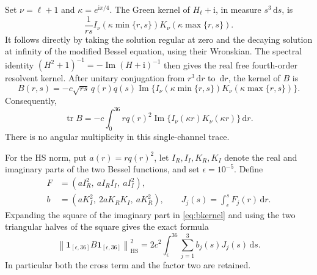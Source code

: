 \documentclass[11pt,a4paper]{article}
\theoremstyle{definition}\newtheorem{definition}[theorem]{Definition}
\theoremstyle{remark}\newtheorem{remark}[theorem]{Remark}
\newcommand{\ii}{\mathrm i}
\newcommand{\dd}{\,\mathrm d}
\newcommand{\norm}[1]{\left\|#1\right\|}
\newcommand{\tr}{\operatorname{tr}}
\newcommand{\HS}{\mathrm{HS}}
\newcommand{\Ima}{\operatorname{Im}}
\begin{document}
Set \(\nu=\ell+1\) and \(\kappa=e^{\ii\pi/4}\). The Green kernel of \(H_\ell+\ii\), in measure \(s^3\dd s\), is
\[
 \frac1{rs} I_\nu(\kappa\min\{r,s\})K_\nu(\kappa\max\{r,s\}).
\]
It follows directly by taking the solution regular at zero and the decaying solution at infinity of the modified Bessel equation, using their Wronskian. The spectral identity
\((H^2+1)^{-1}=-\Ima(H+\ii)^{-1}\)
then gives the real free fourth-order resolvent kernel. After unitary conjugation from \(r^3\dd r\) to \(\dd r\), the kernel of \(B\) is
\begin{equation}\label{eq:bkernel}
 B(r,s)=-c\sqrt{rs}\,q(r)q(s)
 \Ima\{I_\nu(\kappa\min\{r,s\})K_\nu(\kappa\max\{r,s\})\}.
\end{equation}
Consequently,
\begin{equation}\label{eq:trace}
 \tr B=-c\int_0^{36}r q(r)^2
 \Ima\{I_\nu(\kappa r)K_\nu(\kappa r)\}\dd r.
\end{equation}
There is no angular multiplicity in this single-channel trace.

For the HS norm, put \(a(r)=rq(r)^2\), let \(I_R,I_I,K_R,K_I\) denote the real and imaginary parts of the two Bessel functions, and set \(\epsilon=10^{-5}\). Define
\begin{align*}
 F&=(aI_R^2,\ aI_RI_I,\ aI_I^2),\\
 b&=(aK_I^2,\ 2aK_RK_I,\ aK_R^2),\qquad
 J_j(s)=\int_\epsilon^sF_j(r)\dd r.
\end{align*}
Expanding the square of the imaginary part in \eqref{eq:bkernel} and using the two triangular halves of the square gives the exact formula
\begin{equation}\label{eq:hs1d}
 \norm{\boldsymbol1_{[\epsilon,36]}B\boldsymbol1_{[\epsilon,36]}}_\HS^2
 =2c^2\int_\epsilon^{36}\sum_{j=1}^3 b_j(s)J_j(s)\dd s.
\end{equation}
In particular both the cross term and the factor two are retained.
\end{document}
